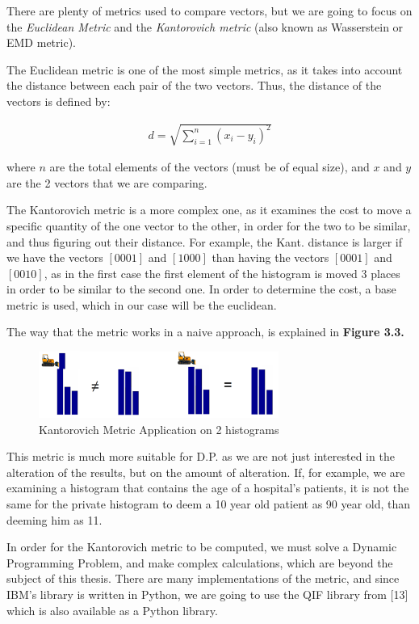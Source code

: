 There are plenty of metrics used to compare vectors, but we are going to focus on the \emph{Euclidean Metric} and the \emph{Kantorovich metric} (also known as Wasserstein or EMD metric). 

The Euclidean metric is one of the most simple metrics, as it takes into account the distance between each pair of the two vectors. Thus, the distance of the vectors is defined by:

\begin{align*}
    d = \sqrt{\sum_{i=1}^n (x_i - y_i) ^ 2}
\end{align*}

where $n$ are the total elements of the vectors (must be of equal size), and $x$ and $y$ are the 2 vectors that we are comparing.

The Kantorovich metric is a more complex one, as it examines the cost to move a specific quantity of the one vector to the other, in order for the two to be similar, and thus figuring out their distance. For example, the Kant. distance is larger if we have the vectors $[0 0 0 1]$ and $[1 0 0 0]$ than having the vectors $[0 0 0 1]$ and $[0 0 1 0]$, as in the first case the first element of the histogram is moved 3 places in order to be similar to the second one. In order to determine the cost, a base metric is used, which in our case will be the euclidean.

The way that the metric works in a naive approach, is explained in \textbf{Figure 3.3.}

\begin{figure}[!htb]\centering
    \includegraphics[width=0.7\textwidth]{images/emd.png}
    \caption{Kantorovich Metric Application on 2 histograms}
\end{figure}

This metric is much more suitable for D.P. as we are not just interested in the alteration of the results, but on the amount of alteration. If, for example, we are examining a histogram that contains the age of a hospital's patients, it is not the same for the private histogram to deem a 10 year old patient as 90 year old, than deeming him as 11. 

In order for the Kantorovich metric to be computed, we must solve a Dynamic Programming Problem, and make complex calculations, which are beyond the subject of this thesis. There are many implementations of the metric, and since IBM's library is written in Python, we are going to use the QIF library from [13] which is also available as a Python library. 


